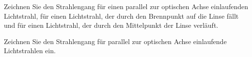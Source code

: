 \documentclass[12pt,a4paper,twoside]{article}
\begin{document}
\begin{aufgabe}
	Zeichnen Sie den Strahlengang für einen parallel zur optischen Achse einlaufenden Lichtstrahl, für einen Lichtstrahl, der durch
	den Brennpunkt auf die Linse fällt und für einen Lichtstrahl, der durch den Mittelpunkt der Linse verläuft.
\end{aufgabe}

\begin{center}
\end{center}

\begin{aufgabe}
	Zeichnen Sie den Strahlengang für parallel zur optischen Achse einlaufende Lichtstrahlen ein.
\end{aufgabe}

\begin{center}
\end{center}


\end{document}

